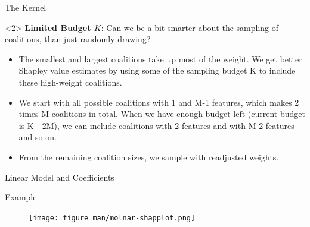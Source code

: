\documentclass[11pt,compress,t,notes=noshow, aspectratio=169, xcolor=table]{beamer}
\begin{document}
\begin{vbframe}{The Kernel}
\begin{onlyenv}<2>
\textbf{Limited Budget $K$}: Can we be a bit smarter about the sampling of coalitions, than just randomly drawing?
\begin{itemize}
    \item The smallest and largest coalitions take up most of the weight. We get better Shapley value estimates by using some of the sampling budget K to include these high-weight coalitions.
    \item We start with all possible coalitions with 1 and M-1 features, which makes 2 times M coalitions in total. When we have enough budget left (current budget is K - 2M), we can include coalitions with 2 features and with M-2 features and so on.
    \item From the remaining coalition sizes, we sample with readjusted weights.
\end{itemize}
\end{onlyenv}
  

 \end{vbframe}
 
 \begin{vbframe}{Linear Model and Coefficients}

 \end{vbframe}
 
\begin{vbframe}{Example}

\begin{figure}
    \centering
    \texttt{[image: figure\_man/molnar-shapplot.png]}
\end{figure}

\end{vbframe}
\end{document}
